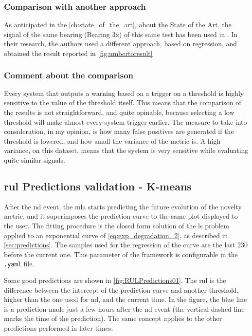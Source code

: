 \subsubsection{Comparison with another approach}
As anticipated in the \autoref{ch:state_of_the_art}, about the State of the Art, the signal of the same bearing (Bearing 3x) of this same test has been used in \cite{Umberto}. In their research, the authors used a different approach, based on regression, and obtained the result reported in \autoref{fig:umbertoresult}


\subsubsection{Comment about the comparison}
Every system that outputs a warning based on a trigger on a threshold is highly sensitive to the value of the threshold itself. This means that the comparison of the results is not straightforward, and quite opinable, because selecting a low threshold will make almost every system trigger earlier. The measure to take into consideration, in my opinion, is how many false positives are generated if the threshold is lowered, and how small the variance of the metric is. A high variance, on this dataset, means that the system is very sensitive while evaluating quite similar signals.

\subsection{\gls{rul} Predictions validation - K-means}
After the \gls{nd} event, the \gls{mla} starts predicting the future evolution of the novelty metric, and it superimposes the prediction curve to the same plot displayed to the user. The fitting procedure is the closed form solution of the \gls{ls} problem applied to an exponential curve of \autoref{eq:exp_degradation_2}, as described in \autoref{sec:predictions}. The samples used for the regression of the curve are the last 230 before the current one. This parameter of the framework is configurable in the \texttt{.yaml} file. 

Some good predictions are shown in \autoref{fig:RULPredictions01}. The \gls{rul} is the difference between the intercept of the prediction curve and another threshold, higher than the one used for \gls{nd}, and the current time. In the figure, the blue line is a prediction made just a few hours after the \gls{nd} event (the vertical dashed line marks the time of the prediction). The same concept applies to the other predictions performed in later times.


